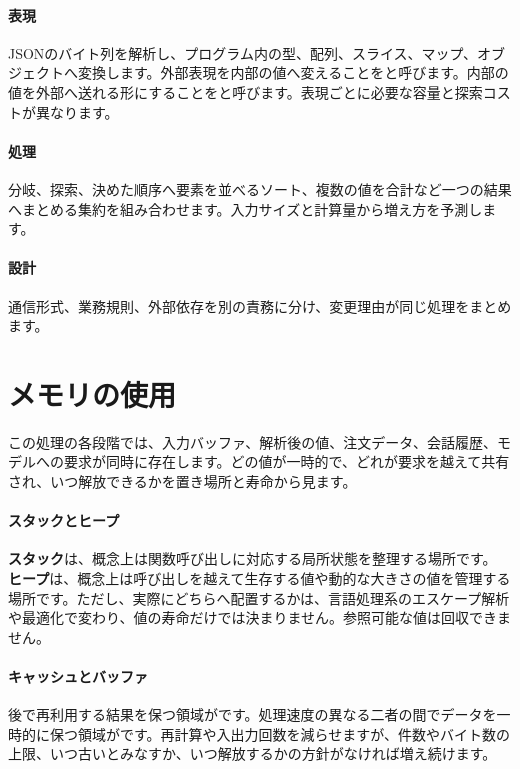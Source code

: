 \paragraph{表現}
        JSONのバイト列を解析し、プログラム内の型、配列、スライス、マップ、オブジェクトへ変換します。外部表現を内部の値へ変えることをと呼びます。内部の値を外部へ送れる形にすることをと呼びます。表現ごとに必要な容量と探索コストが異なります。

\par
\endgroup
\medskip
\begingroup
\paragraph{処理}
        分岐、探索、決めた順序へ要素を並べるソート、複数の値を合計など一つの結果へまとめる集約を組み合わせます。入力サイズと計算量から増え方を予測します。

\par
\endgroup
\medskip
\begingroup
\paragraph{設計}
        通信形式、業務規則、外部依存を別の責務に分け、変更理由が同じ処理をまとめます。

\par
\endgroup
\par
\endgroup


\section{メモリの使用}
\label{sec:07-practice-05}

この処理の各段階では、入力バッファ、解析後の値、注文データ、会話履歴、モデルへの要求が同時に存在します。どの値が一時的で、どれが要求を越えて共有され、いつ解放できるかを置き場所と寿命から見ます。

\begingroup
\begingroup
\paragraph{スタックとヒープ}
        \textbf{スタック}は、概念上は関数呼び出しに対応する局所状態を整理する場所です。
        \textbf{ヒープ}は、概念上は呼び出しを越えて生存する値や動的な大きさの値を管理する場所です。ただし、実際にどちらへ配置するかは、言語処理系のエスケープ解析や最適化で変わり、値の寿命だけでは決まりません。参照可能な値は回収できません。

\paragraph{キャッシュとバッファ}
        後で再利用する結果を保つ領域がです。処理速度の異なる二者の間でデータを一時的に保つ領域がです。再計算や入出力回数を減らせますが、件数やバイト数の上限、いつ古いとみなすか、いつ解放するかの方針がなければ増え続けます。

